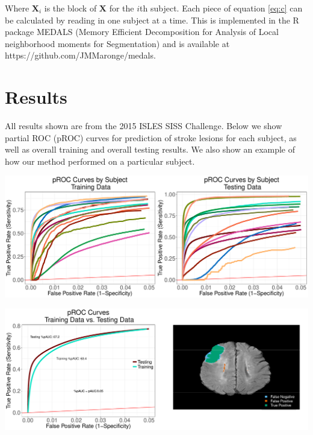 \documentclass[a0,landscape]{a0poster}
\begin{document}
\begin{multicols}{3}
\noindent Where $\mathbf{X}_i$ is the block of $\mathbf{X}$ for the $i$th subject. Each piece of equation \ref{eq:c} can be calculated by reading in one subject at a time. This is implemented in the R package MEDALS (Memory Efficient Decomposition for Analysis of Local neighborhood moments for Segmentation) and is available at https://github.com/JMMaronge/medals.
\vspace{.5cm}



\large{\section*{\color{uwred}Results}}
\noindent All results shown are from the 2015 ISLES SISS Challenge. Below we show partial ROC (pROC) curves for prediction of stroke lesions for each subject, as well as overall training and overall testing results. We also show an example of how our method performed on a particular subject.

\begin{center}\vspace{.5cm}
\includegraphics[width=1\linewidth]{procbysubject.pdf}
\end{center}\vspace{.5cm}


\begin{center}\vspace{.5cm}
\includegraphics[width=1\linewidth]{combined.pdf}
\end{center}\vspace{.5cm}


\end{multicols}
\end{document}
